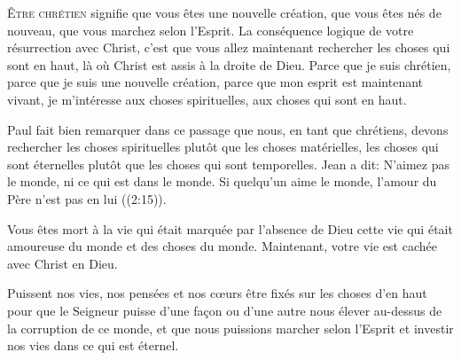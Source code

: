 \dvrule







\lettrine{Ê}{tre chrétien} signifie que vous êtes une nouvelle création,
 que vous êtes nés de nouveau, que vous marchez selon l'Esprit.
 La conséquence logique de votre résurrection avec Christ,
 c'est que vous allez maintenant rechercher les choses
 qui sont en haut, là où Christ est assis à la droite de Dieu.
 Parce que je suis chrétien, parce que je suis une nouvelle création,
 parce que mon esprit est maintenant vivant, je m'intéresse aux choses
 spirituelles, aux choses qui sont en haut.


Paul fait bien remarquer dans ce passage que nous,
 en tant que chrétiens, devons rechercher les choses spirituelles
 plutôt que les choses matérielles, les choses qui sont éternelles plutôt
 que les choses qui sont temporelles. Jean a dit: 
 \Og N'aimez pas le monde, ni ce qui est dans le monde.
 Si quelqu'un aime le monde, l'amour du Père n'est pas en lui \Fg{}
 ((2:15)). 

Vous êtes mort à la vie qui était marquée par l'absence de Dieu
 \ocadr cette vie qui était amoureuse du monde et des choses du monde.
 Maintenant, votre vie est cachée avec Christ en Dieu.

Puissent nos vies, nos pensées et nos c\oe{}urs être fixés
 sur les choses d'en haut \ocadr pour que le Seigneur puisse d'une fa\c{c}on
 ou d'une autre nous élever au-dessus de la corruption de ce monde,
 et que nous puissions marcher selon l'Esprit et investir nos vies
 dans ce qui est éternel.

